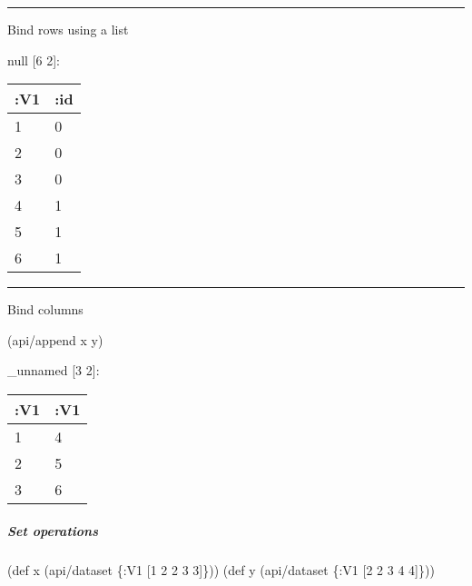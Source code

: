 \documentclass[]{article}
\newenvironment{Shaded}{\begin{snugshade}}{\end{snugshade}}
\newcommand{\AttributeTok}[1]{\textcolor[rgb]{0.77,0.63,0.00}{#1}}
\newcommand{\BuiltInTok}[1]{#1}
\newcommand{\DecValTok}[1]{\textcolor[rgb]{0.00,0.00,0.81}{#1}}
\newcommand{\FunctionTok}[1]{\textcolor[rgb]{0.00,0.00,0.00}{#1}}
\newcommand{\KeywordTok}[1]{\textcolor[rgb]{0.13,0.29,0.53}{\textbf{#1}}}
\newcommand{\NormalTok}[1]{#1}
\newcommand{\VariableTok}[1]{\textcolor[rgb]{0.00,0.00,0.00}{#1}}
\let\oldsubparagraph\subparagraph
\renewcommand{\subparagraph}[1]{\oldsubparagraph{#1}\mbox{}}
\begin{document}
\begin{center}\rule{0.5\linewidth}{0.5pt}\end{center}

Bind rows using a list

\begin{Shaded}
\end{Shaded}

null {[}6 2{]}:

\begin{longtable}[]{@{}ll@{}}
\toprule
:V1 & :id\tabularnewline
\midrule
\endhead
1 & 0\tabularnewline
2 & 0\tabularnewline
3 & 0\tabularnewline
4 & 1\tabularnewline
5 & 1\tabularnewline
6 & 1\tabularnewline
\bottomrule
\end{longtable}

\begin{center}\rule{0.5\linewidth}{0.5pt}\end{center}

Bind columns

\begin{Shaded}
\begin{Highlighting}[]
\NormalTok{(api/append x y)}
\end{Highlighting}
\end{Shaded}

\_unnamed {[}3 2{]}:

\begin{longtable}[]{@{}ll@{}}
\toprule
:V1 & :V1\tabularnewline
\midrule
\endhead
1 & 4\tabularnewline
2 & 5\tabularnewline
3 & 6\tabularnewline
\bottomrule
\end{longtable}

\hypertarget{set-operations}{%
\subparagraph{Set operations}\label{set-operations}}

\begin{Shaded}
\begin{Highlighting}[]
\NormalTok{(}\BuiltInTok{def}\FunctionTok{ x }\NormalTok{(api/dataset \{}\AttributeTok{:V1}\NormalTok{ [}\DecValTok{1} \DecValTok{2} \DecValTok{2} \DecValTok{3} \DecValTok{3}\NormalTok{]\}))}
\NormalTok{(}\BuiltInTok{def}\FunctionTok{ y }\NormalTok{(api/dataset \{}\AttributeTok{:V1}\NormalTok{ [}\DecValTok{2} \DecValTok{2} \DecValTok{3} \DecValTok{4} \DecValTok{4}\NormalTok{]\}))}
\end{Highlighting}
\end{Shaded}
\end{document}
